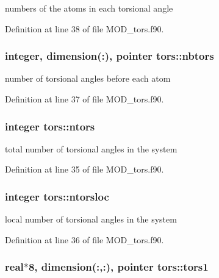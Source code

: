 numbers of the atoms in each torsional angle 



Definition at line 38 of file M\-O\-D\-\_\-tors.\-f90.

\hypertarget{classtors_ae485dde8e89b669d1fdb5c91c0ae4777}{
\subsubsection[{nbtors}]{\setlength{\rightskip}{0pt plus 5cm}integer, dimension(\-:), pointer tors\-::nbtors}}\label{classtors_ae485dde8e89b669d1fdb5c91c0ae4777}


number of torsional angles before each atom 



Definition at line 37 of file M\-O\-D\-\_\-tors.\-f90.

\hypertarget{classtors_aa883bf512b1cd4a01eb09910fc3c72cc}{
\subsubsection[{ntors}]{\setlength{\rightskip}{0pt plus 5cm}integer tors\-::ntors}}\label{classtors_aa883bf512b1cd4a01eb09910fc3c72cc}


total number of torsional angles in the system 



Definition at line 35 of file M\-O\-D\-\_\-tors.\-f90.

\hypertarget{classtors_a83adafb5bf95a63da4cb0fa82209eb42}{
\subsubsection[{ntorsloc}]{\setlength{\rightskip}{0pt plus 5cm}integer tors\-::ntorsloc}}\label{classtors_a83adafb5bf95a63da4cb0fa82209eb42}


local number of torsional angles in the system 



Definition at line 36 of file M\-O\-D\-\_\-tors.\-f90.

\hypertarget{classtors_a0034d1f878239d3eb1438edde95aec03}{
\subsubsection[{tors1}]{\setlength{\rightskip}{0pt plus 5cm}real$\ast$8, dimension(\-:,\-:), pointer tors\-::tors1}}\label{classtors_a0034d1f878239d3eb1438edde95aec03}


